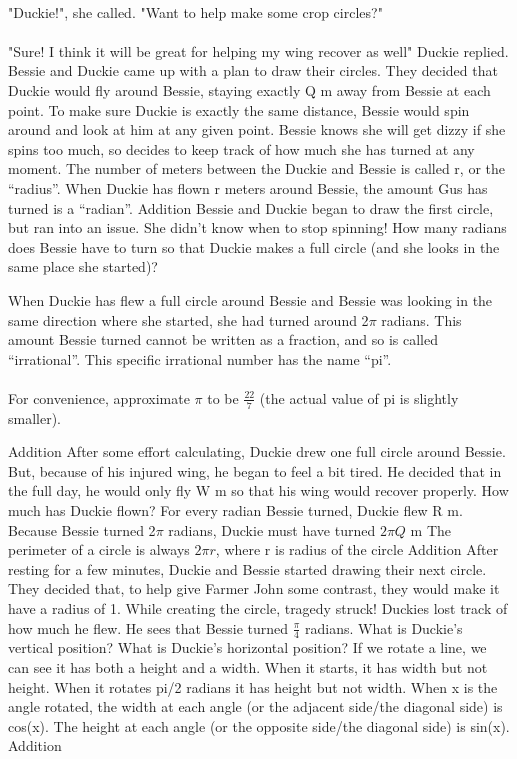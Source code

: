 \documentclass[a4paper,11pt ]{book}
\begin{document}
\paragraph{} "Duckie!", she called. "Want to help make some crop circles?"
\paragraph{} "Sure! I think it will be great for helping my wing recover as well" Duckie replied.
\vfill
\pagebreak
 {Bessie and Duckie came up with a plan to draw their circles. They decided that Duckie would fly around Bessie, staying exactly Q m away from Bessie at each point. To make sure Duckie is exactly the same distance, Bessie would spin around and look at him at any given point. Bessie knows she will get dizzy if she spins too much, so decides to keep track of how much she has turned at any moment.}
 {}
 {The number of meters between the Duckie and Bessie is called r, or the “radius”. When Duckie has flown r meters around Bessie, the amount Gus has turned is a “radian”.}
 {Addition}
 {Bessie and Duckie began to draw the first circle, but ran into an issue. She didn't know when to stop spinning! How many radians does Bessie have to turn so that Duckie makes a full circle (and she looks in the same place she started)?}
 {}
 {When Duckie has flew a full circle around Bessie and Bessie was looking in the same direction where she started, she had turned around 2$\pi$ radians. This amount Bessie turned cannot be written as a fraction, and so is called “irrational”. This specific irrational number has the name “pi”. 
 \paragraph{} For convenience, approximate $\pi$ to be $\frac{22}{7}$ (the actual value of pi is slightly smaller).}
 {Addition}
 {After some effort calculating, Duckie drew one full circle around Bessie. But, because of his injured wing, he began to feel a bit tired. He decided that in the full day, he would only fly W m so that his wing would recover properly. How much has Duckie flown?}
 {For every radian Bessie turned, Duckie flew R m. Because Bessie turned 2$\pi$ radians, Duckie must have turned $2\pi Q$ m}
 {The perimeter of a circle is always $2\pi r$, where r is radius of the circle}
 {Addition}
 {After resting for a few minutes, Duckie and Bessie started drawing their next circle. They decided that, to help give Farmer John some contrast, they would make it have a radius of 1. While creating the circle, tragedy struck! Duckies lost track of how much he flew. He sees that Bessie turned $\frac{\pi}{4}$ radians. What is Duckie's vertical position? What is Duckie's horizontal position?}
 {}
 {If we rotate a line, we can see it has both a height and a width. When it starts, it has width but not height. When it rotates pi/2 radians it has height but not width. When x is the angle rotated, the width at each angle (or the adjacent side/the diagonal side) is cos(x). The height at each angle (or the opposite side/the diagonal side) is sin(x).}
 {Addition}
\end{document}
